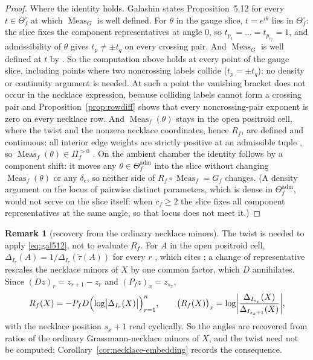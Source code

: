 \documentclass[11pt]{article}
\theoremstyle{definition}
\newtheorem{remark}[theorem]{Remark}
\DeclareMathOperator{\Meas}{Meas}
\newcommand{\Theadm}{\Theta_f^{\mathrm{adm}}}
\begin{document}
\begin{proof}
Where the identity holds. Galashin states Proposition~5.12 for every $t\in\Theta_f^\circ$ at which
$\Meas_G$ is well defined. For $\theta$ in the gauge slice, $t=e^{i\theta}$ lies in $\Theta_f^\circ$:
the slice fixes the component representatives at angle $0$, so $t_{p_1}=\dots=t_{p_{c_f}}=1$, and
admissibility of $\theta$ gives $t_p\ne\pm t_q$ on every crossing pair. And $\Meas_G$ is well defined at
$t$ by \cite[Lem.~5.13]{Galashin}. So the computation above holds at every point of the gauge slice,
including points where two noncrossing labels collide ($t_p=\pm t_q$); no density or continuity
argument is needed. At such a point the vanishing bracket does not occur in the necklace expression,
because colliding labels cannot form a crossing pair and Proposition~\ref{prop:rowdiff} shows that every
noncrossing-pair exponent is zero on every necklace row. And $\Meas_f(\theta)$ stays in the open
positroid cell, where the twist and the nonzero necklace coordinates, hence $R_f$, are defined and
continuous: all interior edge weights are strictly positive at an admissible tuple
\cite[Prop.~4.2]{Galashin}, so $\Meas_f(\theta)\in\Pi_f^{>0}$ \cite[Def.~1.8 and eq.~(2.6)]{Galashin}.
On the ambient chamber the identity follows by a component shift: it moves any $\theta\in\Theadm$ into
the slice without changing $\Meas_f(\theta)$ \cite[Prop.~4.2 and the paragraph following it]{Galashin}
or any $\delta_e$, so neither side of $R_f\circ\Meas_f=G_f$ changes. (A density argument on the locus of
pairwise distinct parameters, which is dense in $\Theadm$, would not serve on the slice itself: when
$c_f\ge2$ the slice fixes all component representatives at the same angle, so that locus does not meet
it.)
\end{proof}

\begin{remark}[recovery from the ordinary necklace minors]\label{rem:untwisted}
The twist is needed to apply \eqref{eq:gal512}, not to evaluate $R_f$. For $A$ in the open positroid cell,
$\Delta_{I_r}(A)=1/\Delta_{I_r}(\widetilde\tau(A))$ for every $r$ \cite[proof of Prop.~5.4]{Galashin}, which
cites \cite[proof of Prop.~6.6]{MullerSpeyer}; a change of representative rescales the necklace minors of
$X$ by one common factor, which $D$ annihilates. Since $(Dz)_r=z_{r+1}-z_r$ and $(P_fz)_x=z_{s_x}$,
\begin{equation}\label{eq:untwisted}
   R_f(X)=-P_fD\Bigl(\log\bigl\lvert\Delta_{I_r}(X)\bigr\rvert\Bigr)_{r=1}^{n},\qquad
   \bigl(R_f(X)\bigr)_x=\log\biggl\lvert\frac{\Delta_{I_{s_x}}(X)}{\Delta_{I_{s_x+1}}(X)}\biggr\rvert,
\end{equation}
with the necklace position $s_x+1$ read cyclically. So the angles are recovered from ratios of the ordinary
Grassmann-necklace minors of $X$, and the twist need not be computed; Corollary~\ref{cor:necklace-embedding}
records the consequence.
\end{remark}
\end{document}

